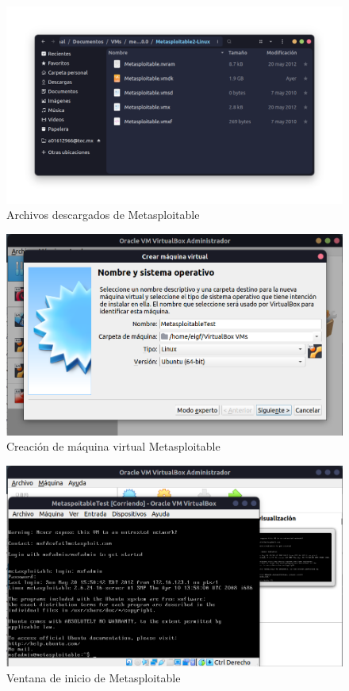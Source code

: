 \documentclass{article}
\begin{document}
        \begin{figure}[!htbp]
            \centering
            \includegraphics[scale=0.2]{img/meta-download.png}
            \caption{Archivos descargados de Metasploitable}
            \label{fig:meta-download}
        \end{figure}

        \begin{figure}[!htbp]
            \centering
            \includegraphics[scale=0.25]{img/meta-create.png}
            \caption{Creación de máquina virtual Metasploitable}
            \label{fig:meta-create}
        \end{figure}

        \begin{figure}[!htbp]
            \centering
            \includegraphics[scale=0.3]{img/meta-init.png}
            \caption{Ventana de inicio de Metasploitable}
            \label{fig:meta-init}
        \end{figure}
\end{document}
